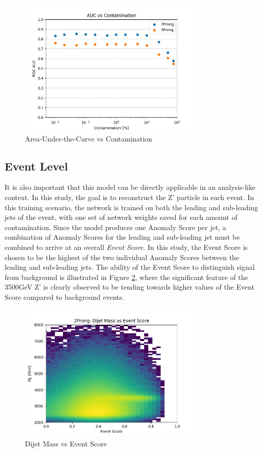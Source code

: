 \documentclass[12pt, a4paper]{article}
\begin{document}
\begin{figure}[H]
	\begin{center}
		\includegraphics[width=250pt]{imgs/AUC_vs_Contam.png}
	\end{center}
	\caption{Area-Under-the-Curve vs Contamination}
	\label{fig:aucs_vs_contam}
\end{figure}


\subsection{Event Level}


It is also important that this model can be directly applicable in an analysis-like context. In this study, the goal is to reconstruct the Z' particle in each event. In this training scenario, the network is trained on both the leading and sub-leading jets of the event, with one set of network weights saved for each amount of contamination. Since the model produces one Anomaly Score per jet, a combination of Anomaly Scores for the leading and sub-leading jet must be combined to arrive at an overall \textit{Event Score}. In this study, the Event Score is chosen to be the highest of the two individual Anomaly Scores between the leading and sub-leading jets. The ability of the Event Score to distinguish signal from background is illustrated in Figure \ref{fig:mjj_vs_evscore}, where the significant feature of the 3500GeV Z' is clearly observed to be tending towards higher values of the Event Score compared to background events. 


\begin{figure}[H]
	\begin{center}
		\includegraphics[width=250pt]{imgs/ProcR_2Prong_Contaminated_10p0_2Prong_Contaminated_10p0_Weights_Event_ConstOnly_Avg_JJ_M_vs_Event_Score.png}
	\end{center}
	\caption{Dijet Mass vs Event Score}
	\label{fig:mjj_vs_evscore}
\end{figure}
\end{document}
